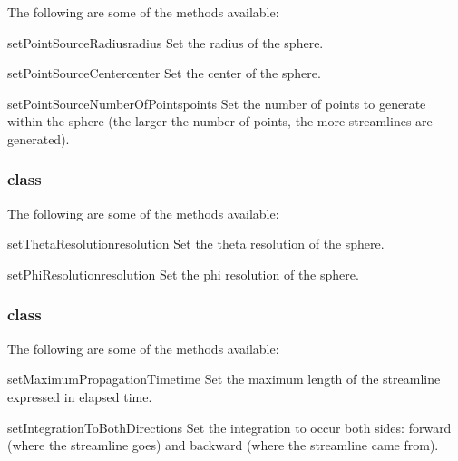 The following are some of the methods available:

\begin{methoddesc}[PointSource]{setPointSourceRadius}{radius}
Set the radius of the sphere.
\end{methoddesc}

\begin{methoddesc}[PointSource]{setPointSourceCenter}{center}
Set the center of the sphere.
\end{methoddesc}

\begin{methoddesc}[PointSource]{setPointSourceNumberOfPoints}{points}
Set the number of points to generate within the sphere (the larger the
number of points, the more streamlines are generated).
\end{methoddesc}

\subsubsection{\Sphere class}

The following are some of the methods available:

\begin{methoddesc}[Sphere]{setThetaResolution}{resolution}
Set the theta resolution of the sphere.
\end{methoddesc}

\begin{methoddesc}[Sphere]{setPhiResolution}{resolution}
Set the phi resolution of the sphere.
\end{methoddesc}

\subsubsection{\StreamLineModule class}

The following are some of the methods available:

\begin{methoddesc}[StreamLineModule]{setMaximumPropagationTime}{time}
Set the maximum length of the streamline expressed in elapsed time.
\end{methoddesc}

\begin{methoddesc}[StreamLineModule]{setIntegrationToBothDirections}{}
Set the integration to occur both sides: forward (where the streamline
goes) and backward (where the streamline came from).
\end{methoddesc}

